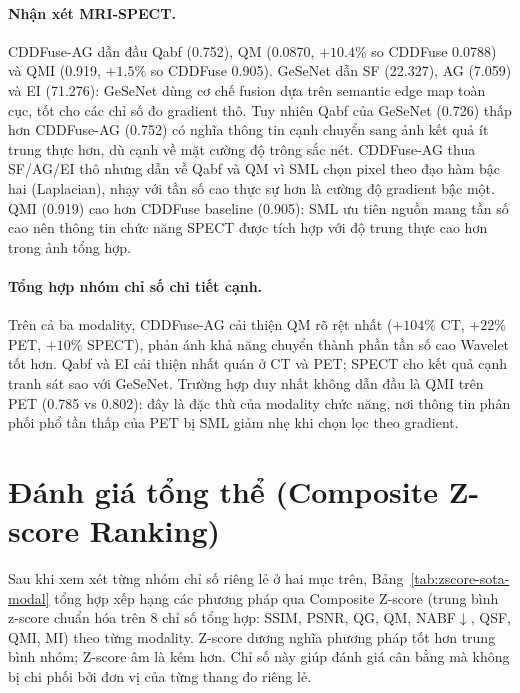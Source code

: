 \paragraph{Nhận xét MRI-SPECT.}
CDDFuse-AG dẫn đầu Qabf (0.752), QM (0.0870, $+10.4\%$ so CDDFuse 0.0788) và QMI (0.919, $+1.5\%$ so CDDFuse 0.905). GeSeNet dẫn SF (22.327), AG (7.059) và EI (71.276): GeSeNet dùng cơ chế fusion dựa trên semantic edge map toàn cục, tốt cho các chỉ số đo gradient thô. Tuy nhiên Qabf của GeSeNet (0.726) thấp hơn CDDFuse-AG (0.752) có nghĩa thông tin cạnh chuyển sang ảnh kết quả ít trung thực hơn, dù cạnh về mặt cường độ trông sắc nét. CDDFuse-AG thua SF/AG/EI thô nhưng dẫn về Qabf và QM vì SML chọn pixel theo đạo hàm bậc hai (Laplacian), nhạy với tần số cao thực sự hơn là cường độ gradient bậc một. QMI (0.919) cao hơn CDDFuse baseline (0.905): SML ưu tiên nguồn mang tần số cao nên thông tin chức năng SPECT được tích hợp với độ trung thực cao hơn trong ảnh tổng hợp.

\paragraph{Tổng hợp nhóm chỉ số chi tiết cạnh.}
Trên cả ba modality, CDDFuse-AG cải thiện QM rõ rệt nhất ($+104\%$ CT, $+22\%$ PET, $+10\%$ SPECT), phản ánh khả năng chuyển thành phần tần số cao Wavelet tốt hơn. Qabf và EI cải thiện nhất quán ở CT và PET; SPECT cho kết quả cạnh tranh sát sao với GeSeNet. Trường hợp duy nhất không dẫn đầu là QMI trên PET (0.785 vs 0.802): đây là đặc thù của modality chức năng, nơi thông tin phân phối phổ tần thấp của PET bị SML giảm nhẹ khi chọn lọc theo gradient.

\section{Đánh giá tổng thể (Composite Z-score Ranking)}
\label{sec:zscore-per-modal}

Sau khi xem xét từng nhóm chỉ số riêng lẻ ở hai mục trên, Bảng~\ref{tab:zscore-sota-modal} tổng hợp xếp hạng các phương pháp qua Composite Z-score (trung bình z-score chuẩn hóa trên 8 chỉ số tổng hợp: SSIM, PSNR, QG, QM, NABF$\downarrow$, QSF, QMI, MI) theo từng modality. Z-score dương nghĩa phương pháp tốt hơn trung bình nhóm; Z-score âm là kém hơn. Chỉ số này giúp đánh giá cân bằng mà không bị chi phối bởi đơn vị của từng thang đo riêng lẻ.

